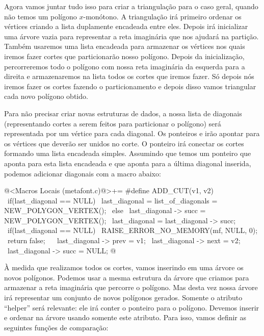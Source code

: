 {{{{{{Agora vamos juntar tudo isso para criar a triangulação para o caso
geral, quando não temos um polígono $x$-monótono. A triangulação irá
primeiro ordenar os vértices criando a lista duplamente encadeada
entre eles. Depois irá inicializar uma árvore vazia para representar a
reta imaginária que nos ajudará na partição. Também usaremos uma lista
encadeada para armazenar os vértices nos quais iremos fazer cortes que
particionarão nosso polígono. Depois da inicialização, percorreremos
todo o polígono com nossa reta imaginária da esquerda para a direita e
armazenaremos na lista todos os cortes que iremos fazer. Só depois nós
iremos fazer os cortes fazendo o particionamento e depois disso vamos
triangular cada novo polígono obtido.

Para não precisar criar novas estruturas de dados, a nossa lista de
diagonais (representando cortes a serem feitos para particionar o
polígono) será representada por um vértice para cada diagonal. Os
ponteiros  e  irão apontar para os
vértices que deverão ser unidos no corte. O ponteiro 
irá conectar os cortes formando uma lista encadeada simples. Assumindo
que temos um ponteiro  que aponta para
esta lista encadeada e  que aponta para a
última diagonal inserida, podemos adicionar diagonais com a macro
abaixo:

\iniciocodigo
@<Macros Locais (metafont.c)@>+=
#define ADD_CUT(v1, v2) {                                    \
  if(last_diagonal == NULL){                                 \
    last_diagonal = list_of_diagonals = NEW_POLYGON_VERTEX();\
  } else{                                                    \
    last_diagonal -> succ = NEW_POLYGON_VERTEX();            \
    last_diagonal = last_diagonal -> succ;                   \
  }                                                          \
  if(last_diagonal == NULL){                                 \
    RAISE_ERROR_NO_MEMORY(mf, NULL, 0);                      \
    return false;                                            \
  }                                                          \
  last_diagonal -> prev = v1;                                \
  last_diagonal -> next = v2;                                \
  last_diagonal -> succ = NULL;}
@
\fimcodigo

À medida que realizamos todos os cortes, vamos inserindo em uma árvore
os novos polígonos. Podemos usar a mesma estrutura da árvore que
criamos para armazenar a reta imaginária que percorre o polígono. Mas
desta vez nossa árvore irá representar um conjunto de novos polígonos
gerados. Somente o atributo ``helper'' será relevante: ele irá conter
o ponteiro para o polígono. Devemos inserir e ordenar na árvore usando
somente este atributo. Para isso, vamos definir as seguintes funções
de comparação:

}}}}}}
